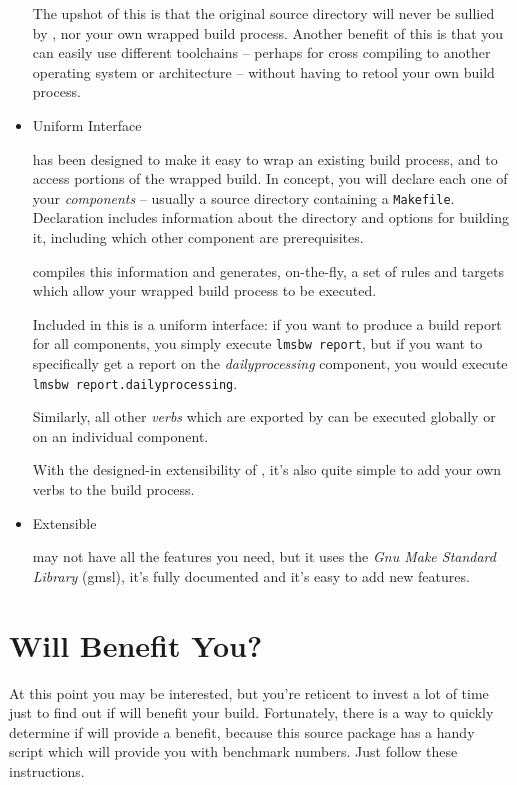 \begin{itemize}
  The upshot of this is that the original source directory will never
  be sullied by \lmsbw, nor your own wrapped build process.  Another
  benefit of this is that you can easily use different toolchains --
  perhaps for cross compiling to another operating system or
  architecture -- without having to retool your own build process.

\item Uniform Interface

  \lmsbw has been designed to make it easy to wrap an existing build
  process, and to access portions of the wrapped build.  In concept,
  you will declare each one of your \emph{components} -- usually a
  source directory containing a \texttt{Makefile}.  Declaration
  includes information about the directory and options for building
  it, including which other component are prerequisites.

  \lmsbw compiles this information and generates, on-the-fly, a set of
  \make rules and targets which allow your wrapped build process to be
  executed.

  Included in this is a uniform interface: if you want to produce a
  build report for all components, you simply execute \texttt{lmsbw
    report}, but if you want to specifically get a report on the
  \emph{dailyprocessing} component, you would execute \texttt{lmsbw
    report.dailyprocessing}.

  Similarly, all other \emph{verbs} which are exported by \lmsbw can
  be executed globally or on an individual component.

  With the designed-in extensibility of \lmsbw, it's also quite simple
  to add your own verbs to the build process.

\item Extensible

  \lmsbw may not have all the features you need, but it uses the
  \emph{Gnu Make Standard Library} (gmsl), it's fully documented and
  it's easy to add new features.

\end{itemize}

\section{Will \lmsbw Benefit You?}

At this point you may be interested, but you're reticent to invest a
lot of time just to find out if \lmsbw will benefit your build.
Fortunately, there is a way to quickly determine if \lmsbw will
provide a benefit, because this source package has a handy script
which will provide you with benchmark numbers.  Just follow these
instructions.

